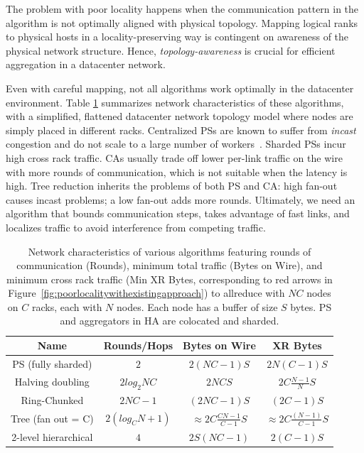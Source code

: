 The problem with poor locality happens when the communication pattern in the algorithm is not optimally aligned with physical topology. Mapping logical ranks to physical hosts in a locality-preserving way is contingent on awareness of the physical network structure. Hence, \textit{topology-awareness} is crucial for efficient aggregation in a datacenter network. %

Even with careful mapping, not all algorithms work optimally in the datacenter environment. Table \ref{table:algoCharacterization} summarizes network characteristics of these algorithms, with a simplified, flattened datacenter network topology model where nodes are simply placed in different racks. Centralized PSs are known to suffer from \textit{incast} congestion and do not scale to a large number of workers~\cite{firecaffe,Geng:2018:HHP:3229543.3229544}. Sharded PSs incur high cross rack traffic. CAs usually trade off lower per-link traffic on the wire with more rounds of communication, which is not suitable when the latency is high. Tree reduction inherits the problems of both PS and CA: high fan-out causes incast problems; a low fan-out adds more rounds. Ultimately, we need an algorithm that bounds communication steps, takes advantage of fast links, and localizes traffic to avoid interference from competing traffic.

\begin{table}[ht]
	\centering
	\begin{tabular}{|c|c|c|c|}
		\hline 
		Name & Rounds/Hops & Bytes on Wire & XR Bytes \\
		\hline
		PS (fully sharded)  & $2$ & $2(NC-1)S$ & $2N(C-1)S$  \\
		\hline
		Halving doubling & $2log_2NC$ & $2NCS$ & $2C\frac{N-1}{N}S$ \\ 
		\hline 
		Ring-Chunked & $2NC-1$ & $(2NC-1)S$ & $(2C-1)S$ \\
		\hline
        Tree (fan out = C) & $2(log_CN + 1)$ & $\approx2C\frac{CN-1}{C-1}S $ & $\approx2C\frac{(N-1)}{C-1}S$ \\ %
        \hline
        \hline
        2-level hierarchical & $4$ & $2S(NC-1)$ & $2(C-1)S$ \\
		\hline
	\end{tabular}
	\caption{Network characteristics of various algorithms featuring rounds of communication (Rounds), minimum total traffic (Bytes on Wire), and minimum cross rack traffic (Min XR Bytes, corresponding to red arrows in Figure~\ref{fig:poorlocalitywithexistingapproach}) to allreduce with $NC$ nodes on $C$ racks, each with $N$ nodes. Each node has a buffer of size $S$ bytes. PS and aggregators in HA are colocated and sharded.}
	\label{table:algoCharacterization}
\end{table}

